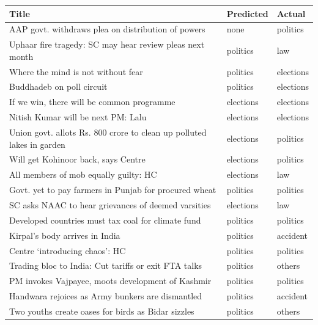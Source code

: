 
\newpage


\begin{table}
\small
\begin{tabular}{ | p{5.4cm}| p{2.0cm} | p{2.0cm} | }
\hline
\textbf{Title} & \textbf{Predicted} & \textbf{Actual} \\
\hline
AAP govt. withdraws plea on distribution of powers & none  & politics  \\
\hline
Uphaar fire tragedy: SC may hear review pleas next month & politics  & law  \\
\hline
Where the mind is not without fear & politics  & elections  \\
\hline
Buddhadeb on poll circuit & politics  & elections \\
\hline
If we win, there will be common programme & elections  & elections  \\
\hline
Nitish Kumar will be next PM: Lalu & elections  & elections  \\
\hline
Union govt. allots Rs. 800 crore to clean up polluted lakes in garden  & elections & politics \\
\hline
Will get Kohinoor back, says Centre & elections  & politics  \\
\hline
All members of mob equally guilty: HC & elections  & law  \\
\hline
Govt. yet to pay farmers in Punjab for procured wheat & politics  & politics  \\
\hline
SC asks NAAC to hear grievances of deemed varsities & elections  & law  \\
\hline
Developed countries must tax coal for climate fund & politics  & politics \\
\hline
Kirpal’s body arrives in India & politics  & accident  \\
\hline
Centre ‘introducing chaos’: HC & politics  & politics  \\
\hline
Trading bloc to India: Cut tariffs or exit FTA talks & politics  & others  \\
\hline
PM invokes Vajpayee, moots development of Kashmir & politics  & politics  \\
\hline
Handwara rejoices as Army bunkers are dismantled & politics  & accident   \\
\hline
Two youths create oases for birds as Bidar sizzles & politics  & others \\

\end{tabular}
\end{table}
